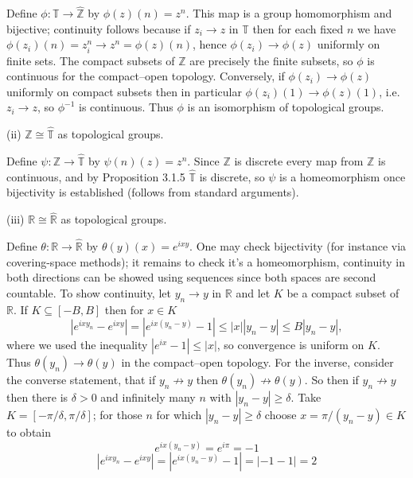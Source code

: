 \documentclass{article}
\begin{document}
\smallskip

Define $\phi:\mathbb T\to\widehat{\mathbb Z}$ by $\phi(z)(n)=z^n$. This map is a group homomorphism and bijective; continuity follows because if $z_i\to z$ in $\mathbb T$ then for each fixed $n$ we have $\phi(z_i)(n)=z_i^n\to z^n=\phi(z)(n)$, hence $\phi(z_i)\to\phi(z)$ uniformly on finite sets. The compact subsets of $\mathbb Z$ are precisely the finite subsets, so $\phi$ is continuous for the compact–open topology. Conversely, if $\phi(z_i)\to\phi(z)$ uniformly on compact subsets then in particular $\phi(z_i)(1)\to\phi(z)(1)$, i.e. $z_i\to z$, so $\phi^{-1}$ is continuous. Thus $\phi$ is an isomorphism of topological groups.

\medskip

(ii) $\mathbb Z \cong \widehat{\mathbb T}$ as topological groups.

\smallskip

Define $\psi:\mathbb Z\to\widehat{\mathbb T}$ by $\psi(n)(z)=z^n$. Since $\mathbb Z$ is discrete every map from $\mathbb Z$ is continuous, and by Proposition 3.1.5 $\widehat{\mathbb T}$ is discrete, so $\psi$ is a homeomorphism once bijectivity is established (follows from standard arguments).

\medskip

(iii) $\mathbb R \cong \widehat{\mathbb R}$ as topological groups.

\smallskip

Define $\theta:\mathbb R\to\widehat{\mathbb R}$ by $\theta(y)(x)=e^{ixy}$. One may check bijectivity (for instance via covering-space methods); it remains to check it's a homeomorphism, continuity in both directions can be showed using sequences since both spaces are second countable. To show continuity, let $y_n\to y$ in $\mathbb R$ and let $K$ be a compact subset of $\mathbb R$. If $K \subseteq [-B,B]$ then for $x\in K$
\[
|e^{ixy_n}-e^{ixy}|=|e^{ix(y_n-y)}-1|\le |x||y_n-y|\le B|y_n-y|,
\]
where we used the inequality $|e^{ix} - 1| \leq |x|$, so convergence is uniform on $K$. Thus $\theta(y_n)\to\theta(y)$ in the compact–open topology. For the inverse, consider the converse statement, that if $y_n \not \rightarrow y $ then $\theta(y_n) \not \rightarrow \theta(y)$. So then if $y_n\not\to y$ then there is $\delta>0$ and infinitely many $n$ with $|y_n-y|\ge\delta$. Take $K=[-\pi/\delta,\pi/\delta]$; for those $n$ for which $|y_n - y| \geq \delta$ choose $x=\pi/(y_n-y)\in K$ to obtain
$$e^{ix(y_n-y)} = e^{i\pi} = -1$$
$$|e^{ixy_n} - e^{ixy}| = |e^{ix(y_n-y)} - 1 | = |-1-1| = 2$$
\end{document}
